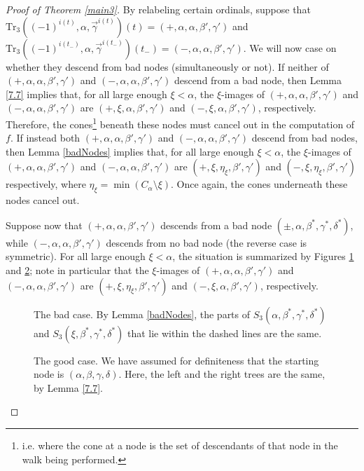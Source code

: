 \documentclass{amsart}
\numberwithin{theorem}{section}
\theoremstyle{definition}
\newcommand{\Tr}{\mathrm{Tr}}
\begin{document}
\begin{proof}[Proof of Theorem \ref{main3}]
By relabeling certain ordinals, suppose that $\Tr_3((-1)^{i(t)},\alpha,\vec{\gamma}^{i(t)})(t) = (+,\alpha,\alpha,\beta',\gamma')$ and 
$\Tr_3((-1)^{i(t_-)},\alpha,\vec{\gamma}^{i(t_-)})(t_-) = (-,\alpha,\alpha,\beta',\gamma')$. We will now case on whether they descend from bad nodes (simultaneously or not). If neither of $(+,\alpha,\alpha,\beta',\gamma')$ and $(-,\alpha,\alpha,\beta',\gamma')$ descend from a bad node, then Lemma \ref{7.7} implies that, for all large enough $\xi<\alpha$, the $\xi$-images of $(+,\alpha,\alpha,\beta',\gamma')$ and $(-,\alpha,\alpha,\beta',\gamma')$ are $(+,\xi,\alpha,\beta',\gamma')$ and $(-,\xi,\alpha,\beta',\gamma')$, respectively. Therefore, the cones\footnote{i.e. where the cone at a node is the set of descendants of that node in the walk being performed.} beneath these nodes must cancel out in the computation of $f$. If instead both $(+,\alpha,\alpha,\beta',\gamma')$ and $(-,\alpha,\alpha,\beta',\gamma')$ descend from bad nodes, then Lemma \ref{badNodes} implies that, for all large enough $\xi<\alpha$, the $\xi$-images of $(+,\alpha,\alpha,\beta',\gamma')$ and $(-,\alpha,\alpha,\beta',\gamma')$ are $(+,\xi,\eta_\xi,\beta',\gamma')$ and $(-,\xi,\eta_\xi,\beta',\gamma')$ respectively, where $\eta_\xi=\min(C_\alpha\setminus\xi)$. Once again, the cones underneath these nodes cancel out.%


Suppose now that $(+,\alpha,\alpha,\beta',\gamma')$ descends from a bad node $(\pm,\alpha,\beta^*,\gamma^*,\delta^*)$, while $(-,\alpha,\alpha,\beta',\gamma')$ descends from no bad node (the reverse case is symmetric). For all large enough $\xi<\alpha$, the situation is summarized by Figures \ref{alpha_xi_sides} and \ref{goodFig}; note in particular that the $\xi$-images of $(+,\alpha,\alpha,\beta',\gamma')$ and $(-,\alpha,\alpha,\beta',\gamma')$ are $(+,\xi,\eta_\xi,\beta',\gamma')$ and $(-,\xi,\alpha,\beta',\gamma')$, respectively.

\begin{figure}[ht]
\caption{The bad case. By Lemma \ref{badNodes}, the parts of $S_3(\alpha,\beta^*,\gamma^*,\delta^*)$ and $S_3(\xi,\beta^*,\gamma^*,\delta^*)$ that lie within the dashed lines are the same.}
\label{alpha_xi_sides}
\end{figure}


\begin{figure}[ht]
\caption{The good case. We have assumed for definiteness that the starting node is $(\alpha,\beta,\gamma,\delta)$. Here, the left and the right trees are the same, by Lemma \ref{7.7}.}%
\label{goodFig}
\end{figure}


\end{proof}
\end{document}
